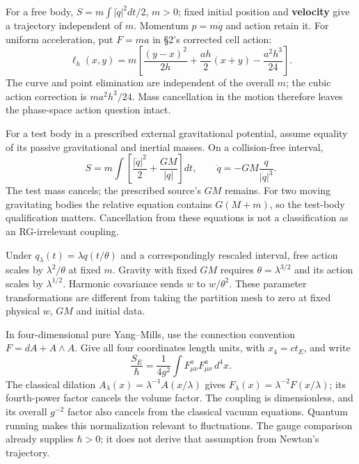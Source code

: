 \documentclass[11pt,a4paper]{article}
\begin{document}
For a free body, \(S=m\int|\dot q|^2dt/2\), \(m>0\); fixed initial
position and \textbf{velocity} give a trajectory independent of \(m\).
Momentum \(p=m\dot q\) and action retain it. For uniform acceleration,
put \(F=ma\) in §2's corrected cell action: \[\ell_h(x,y)=m\left[
\frac{(y-x)^2}{2h}+\frac{ah}2(x+y)-\frac{a^2h^3}{24}\right].
\tag{6n}\] The curve and point elimination are independent of the
overall \(m\); the cubic action correction is \(ma^2h^3/24\). Mass
cancellation in the motion therefore leaves the phase-space action
question intact.

For a test body in a prescribed external gravitational potential, assume
equality of its passive gravitational and inertial masses. On a
collision-free interval,
\[S=m\int\left[\frac{|\dot q|^2}2+\frac{GM}{|q|}\right]dt,
\qquad \ddot q=-GM\frac q{|q|^3}.\tag{6o}\] The test mass cancels; the
prescribed source's \(GM\) remains. For two moving gravitating bodies
the relative equation contains \(G(M+m)\), so the test-body
qualification matters. Cancellation from these equations is not a
classification as an RG-irrelevant coupling.

Under \(q_\lambda(t)=\lambda q(t/\theta)\) and a correspondingly
rescaled interval, free action scales by \(\lambda^2/\theta\) at fixed
\(m\). Gravity with fixed \(GM\) requires \(\theta=\lambda^{3/2}\) and
its action scales by \(\lambda^{1/2}\). Harmonic covariance sends \(w\)
to \(w/\theta^2\). These parameter transformations are different from
taking the partition mesh to zero at fixed physical \(w\), \(GM\) and
initial data.

In four-dimensional pure Yang--Mills, use the connection convention
\(F=dA+A\wedge A\). Give all four coordinates length units, with
\(x_4=ct_E\), and write
\[\frac{S_E}{\hbar}=\frac1{4g^2}\int F^a_{\mu\nu}F^a_{\mu\nu}
\,d^4x.\] The classical dilation
\(A_\lambda(x)=\lambda^{-1}A(x/\lambda)\) gives
\(F_\lambda(x)=\lambda^{-2}F(x/\lambda)\); its fourth-power factor
cancels the volume factor. The coupling is dimensionless, and its
overall \(g^{-2}\) factor also cancels from the classical vacuum
equations. Quantum running makes this normalization relevant to
fluctuations. The gauge comparison already supplies \(\hbar>0\); it does
not derive that assumption from Newton's trajectory.
\end{document}
